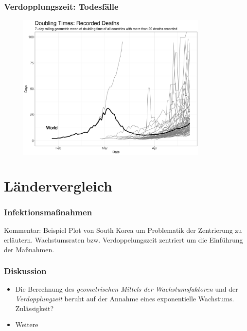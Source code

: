 \documentclass{beamer}
\begin{document}
\begin{frame}
	\frametitle{Verdopplungszeit: Todesfälle}
	\begin{figure}
		\centering
		\includegraphics[width = 270pt]{DT_deaths}
	\end{figure}
\end{frame}

\section{Ländervergleich}
\begin{frame}
	\frametitle{Infektionsmaßnahmen}
	Kommentar: Beispiel Plot von South Korea um Problematik der Zentrierung zu erläutern. Wachstumsraten bzw. Verdoppelungszeit zentriert um die Einführung der Maßnahmen.
\end{frame}

\begin{frame}
	\frametitle{Diskussion}
	\begin{itemize}
		\item Die Berechnung des \emph{geometrischen Mittels der Wachstumsfaktoren} und der \emph{Verdopplungzeit} beruht auf der Annahme eines exponentielle Wachstums. Zulässigkeit?
		\item Weitere
	\end{itemize}
\end{frame}
 
\end{document}
